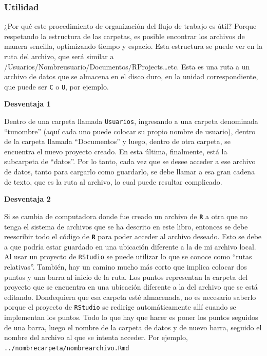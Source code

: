 \documentclass[
]{article}
\begin{document}
\hypertarget{utilidad}{%
\subsubsection{Utilidad}\label{utilidad}}

¿Por qué este procedimiento de organización del flujo de trabajo es útil? Porque respetando la estructura de las carpetas, es posible encontrar los archivos de manera sencilla, optimizando tiempo y espacio. Esta estructura se puede ver en la ruta del archivo, que será similar a /Usuarios/Nombreusuario/Documentos/RProjects\ldots etc. Esta es una ruta a un archivo de datos que se almacena en el disco duro, en la unidad correspondiente, que puede ser \texttt{C} o \texttt{U}, por ejemplo.

\textbf{Desventaja 1}

Dentro de una carpeta llamada \texttt{Usuarios}, ingresando a una carpeta denominada ``tunombre'' (aquí cada uno puede colocar su propio nombre de usuario), dentro de la carpeta llamada ``Documentos'' y luego, dentro de otra carpeta, se encuentra el nuevo proyecto creado. En esta última, finalmente, está la subcarpeta de ``datos''. Por lo tanto, cada vez que se desee acceder a ese archivo de datos, tanto para cargarlo como guardarlo, se debe llamar a esa gran cadena de texto, que es la ruta al archivo, lo cual puede resultar complicado.

\textbf{Desventaja 2}

Si se cambia de computadora donde fue creado un archivo de \textbf{\texttt{R}} a otra que no tenga el sistema de archivos que se ha descrito en este libro, entonces se debe reescribir todo el código de \textbf{\texttt{R}} para poder acceder al archivo deseado. Esto se debe a que podría estar guardado en una ubicación diferente a la de mi archivo local. Al usar un proyecto de \texttt{RStudio} se puede utilizar lo que se conoce como ``rutas relativas''. También, hay un camino mucho más corto que implica colocar dos puntos y una barra al inicio de la ruta. Los puntos representan la carpeta del proyecto que se encuentra en una ubicación diferente a la del archivo que se está editando. Dondequiera que esa carpeta esté almacenada, no es necesario saberlo porque el proyecto de \texttt{RStudio} se redirige automáticamente allí cuando se implementan los puntos. Todo lo que hay que hacer es poner los puntos seguidos de una barra, luego el nombre de la carpeta de datos y de nuevo barra, seguido el nombre del archivo al que se intenta acceder. Por ejemplo, \texttt{../nombrecarpeta/nombrearchivo.Rmd}
\end{document}
